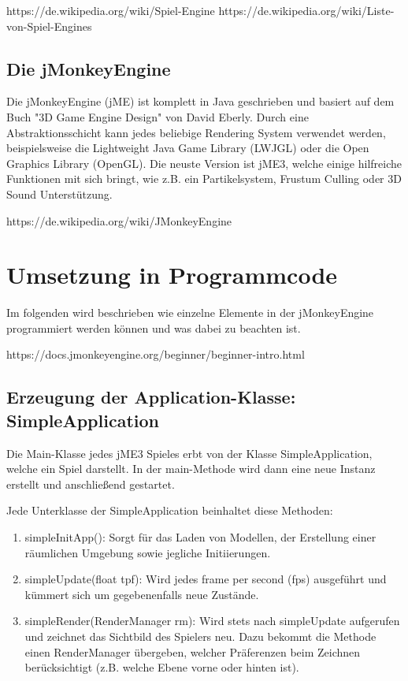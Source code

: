 https://de.wikipedia.org/wiki/Spiel-Engine
https://de.wikipedia.org/wiki/Liste-von-Spiel-Engines


\subsection {Die jMonkeyEngine}
Die jMonkeyEngine (jME) ist komplett in Java geschrieben und basiert auf dem Buch "3D Game Engine Design" von David Eberly.
Durch eine Abstraktionsschicht kann jedes beliebige Rendering System verwendet werden, beispielsweise die Lightweight Java Game Library (LWJGL) oder die Open Graphics Library (OpenGL).
Die neuste Version ist jME3, welche einige hilfreiche Funktionen mit sich bringt, wie z.B. ein Partikelsystem, Frustum Culling oder 3D Sound Unterstützung.


https://de.wikipedia.org/wiki/JMonkeyEngine


\section{Umsetzung in Programmcode}\label{sec:code}
Im folgenden wird beschrieben wie einzelne Elemente in der jMonkeyEngine programmiert werden können und was dabei zu beachten ist.

https://docs.jmonkeyengine.org/beginner/beginner-intro.html

\subsection{Erzeugung der Application-Klasse: SimpleApplication}
Die Main-Klasse jedes jME3 Spieles erbt von der Klasse SimpleApplication, welche ein Spiel darstellt.
In der main-Methode wird dann eine neue Instanz erstellt und anschließend gestartet.

Jede Unterklasse der SimpleApplication beinhaltet diese Methoden:
\begin{enumerate}
	\item simpleInitApp():
	Sorgt für das Laden von Modellen, der Erstellung einer räumlichen Umgebung sowie jegliche Initiierungen.
	\item simpleUpdate(float tpf):
	Wird jedes frame per second (fps) ausgeführt und kümmert sich um gegebenenfalls neue Zustände.
	\item simpleRender(RenderManager rm):
	Wird stets nach simpleUpdate aufgerufen und zeichnet das Sichtbild des Spielers neu. Dazu bekommt die Methode einen RenderManager übergeben, welcher Präferenzen beim Zeichnen berücksichtigt (z.B. welche Ebene vorne oder hinten ist).
\end{enumerate}

